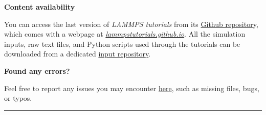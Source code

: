 \thispagestyle{empty}
\setcounter{page}{0}



\vspace{1.5cm}

\noindent \textbf{\large Content availability}

\vspace{0.5cm}

\noindent You can access the last version of \emph{LAMMPS tutorials}
from its \href{https://github.com/lammpstutorials/lammpstutorials.github.io}{Github repository},
which comes with a webpage at \href{https://lammpstutorials.github.io/}{\emph{lammpstutorials.github.io}}.
All the simulation inputs, raw text files, and Python scripts used through
the tutorials can be downloaded from a dedicated
\href{https://github.com/lammpstutorials/lammpstutorials-inputs}{input repository}.

\vspace{0.5cm}

\noindent \textbf{\large Found any errors?}

\vspace{0.5cm}

\noindent Feel free to report any issues you may
encounter \href{https://github.com/lammpstutorials/lammpstutorials.github.io/issues}{here},
such as missing files, bugs, or typos.

\vspace*{\fill}

\par\noindent\rule{\textwidth}{0.5pt}

\doclicenseThis

